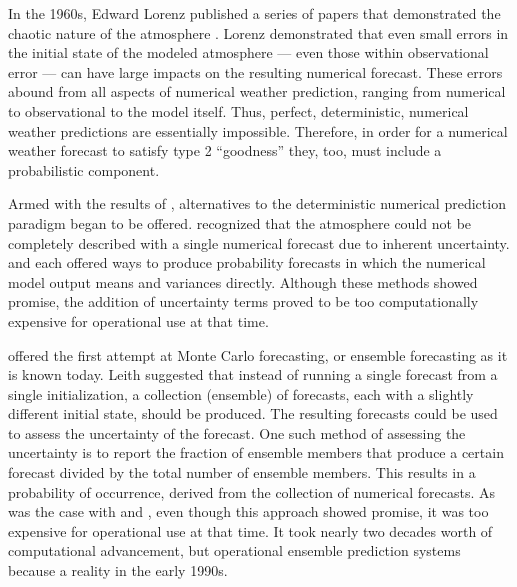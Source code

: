 In the 1960s, Edward Lorenz published a series of papers that demonstrated the chaotic nature of the atmosphere \citep{Lorenz1963, Lorenz1965, Lorenz1968}.
Lorenz demonstrated that even small errors in the initial state of the modeled atmosphere --- even those within observational error --- can have large impacts on the resulting numerical forecast.
These errors abound from all aspects of numerical weather prediction, ranging from numerical to observational to the model itself.
Thus, perfect, deterministic, numerical weather predictions are essentially impossible.
Therefore, in order for a numerical weather forecast to satisfy type 2 ``goodness'' they, too, must include a probabilistic component.


Armed with the results of \cite{Lorenz1963, Lorenz1965, Lorenz1968}, alternatives to the deterministic numerical prediction paradigm began to be offered.
\cite{Epstein1969} recognized that the atmosphere could not be completely described with a single numerical forecast due to inherent uncertainty.
\cite{Epstein1969} and \cite{Gleeson1970} each offered ways to produce probability forecasts in which the numerical model output means and variances directly.
Although these methods showed promise, the addition of uncertainty terms proved to be too computationally expensive for operational use at that time.


\cite{Leith1974} offered the first attempt at Monte Carlo forecasting, or ensemble forecasting as it is known today.
Leith suggested that instead of running a single forecast from a single initialization, a collection (ensemble) of forecasts, each with a slightly different initial state, should be produced.
The resulting forecasts could be used to assess the uncertainty of the forecast.
One such method of assessing the uncertainty is to report the fraction of ensemble members that produce a certain forecast divided by the total number of ensemble members.
This results in a probability of occurrence, derived from the collection of numerical forecasts.
As was the case with \cite{Epstein1969} and \cite{Gleeson1970}, even though this approach showed promise, it was too expensive for operational use at that time.
It took nearly two decades worth of computational advancement, but operational ensemble prediction systems because a reality in the early 1990s.


